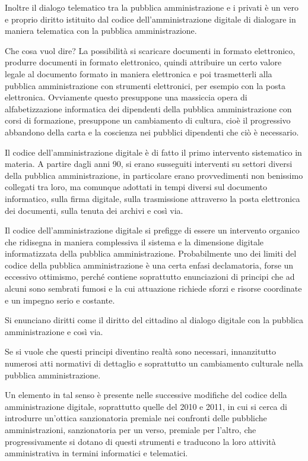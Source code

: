 Inoltre il dialogo telematico tra la pubblica amministrazione e i privati è un vero e proprio diritto istituito dal codice dell'amministrazione digitale di dialogare in maniera telematica con la pubblica amministrazione. 

Che cosa vuol dire? La possibilità si scaricare documenti in formato elettronico, produrre documenti in formato elettronico, quindi attribuire un certo valore legale al documento formato in maniera elettronica e poi trasmetterli alla pubblica amministrazione con strumenti elettronici, per esempio con la posta elettronica. 
Ovviamente questo presuppone una massiccia opera di alfabetizzazione informatica dei dipendenti della pubblica amministrazione con corsi di formazione, presuppone un cambiamento di cultura, cioè il progressivo abbandono della carta e la coscienza nei pubblici dipendenti che ciò è necessario. 

Il codice dell'amministrazione digitale è di fatto il primo intervento sistematico in materia. A partire dagli anni 90, si erano susseguiti interventi su settori diversi della pubblica amministrazione, in particolare erano provvedimenti non benissimo collegati tra loro, ma comunque adottati in tempi diversi sul documento informatico, sulla firma digitale, sulla trasmissione attraverso la posta elettronica dei documenti, sulla tenuta dei archivi e così via. 

Il codice dell'amministrazione digitale si prefigge di essere un intervento organico che ridisegna in maniera complessiva il sistema e la dimensione digitale informatizzata della pubblica amministrazione. 
Probabilmente uno dei limiti del codice della pubblica amministrazione è una certa enfasi declamatoria, forse un eccessivo ottimismo, perché contiene soprattutto enunciazioni di principi che ad alcuni sono sembrati fumosi e la cui attuazione richiede sforzi e risorse coordinate e un impegno serio e costante. 

Si enunciano diritti come il diritto del cittadino al dialogo digitale con la pubblica amministrazione e così via. 

Se si vuole che questi principi diventino realtà sono necessari, innanzitutto numerosi atti normativi di dettaglio e soprattutto un cambiamento culturale nella pubblica amministrazione. 

Un elemento in tal senso è presente nelle successive modifiche del codice della amministrazione digitale, soprattutto  quelle del 2010 e 2011, in cui si cerca di introdurre un'ottica sanzionatoria premiale nei confronti delle pubbliche amministrazioni, sanzionatoria per un verso, premiale per l'altro, che progressivamente si dotano di questi strumenti e traducono la loro attività amministrativa in termini informatici e telematici. 

